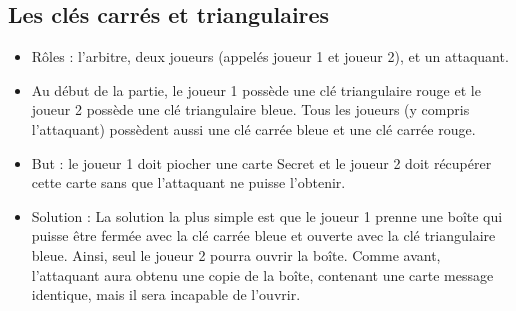 \documentclass[a4paper,10pt]{article}
\begin{document}
\subsection{Les clés carrés et triangulaires}
\begin{itemize}
	\item Rôles : l'arbitre, deux joueurs (appelés joueur 1 et joueur 2), et un attaquant.
	\item Au début de la partie, le joueur 1 possède une clé triangulaire rouge et le joueur 2 possède une clé triangulaire bleue. Tous les joueurs (y compris l'attaquant) possèdent aussi une clé carrée bleue et une clé carrée rouge.
	\item But : le joueur 1 doit piocher une carte Secret et le joueur 2 doit récupérer cette carte sans que l'attaquant ne puisse l'obtenir.
	\item Solution : La solution la plus simple est que le joueur 1 prenne une boîte qui puisse être fermée avec la clé carrée bleue et ouverte avec la clé triangulaire bleue. Ainsi, seul le joueur 2 pourra ouvrir la boîte. Comme avant, l'attaquant aura obtenu une copie de la boîte, contenant une carte message identique, mais il sera incapable de l'ouvrir.
\end{itemize}
\end{document}
